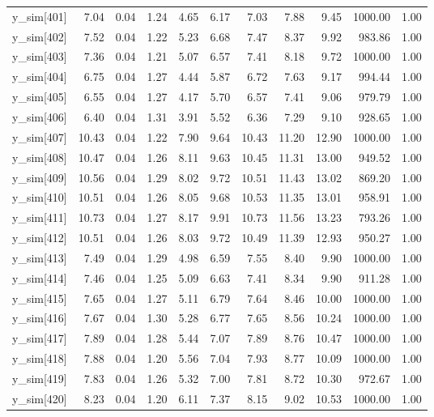 \begin{table}[ht]
\begin{tabular}{rrrrrrrrrrr}
  y\_sim[401] & 7.04 & 0.04 & 1.24 & 4.65 & 6.17 & 7.03 & 7.88 & 9.45 & 1000.00 & 1.00 \\ 
  y\_sim[402] & 7.52 & 0.04 & 1.22 & 5.23 & 6.68 & 7.47 & 8.37 & 9.92 & 983.86 & 1.00 \\ 
  y\_sim[403] & 7.36 & 0.04 & 1.21 & 5.07 & 6.57 & 7.41 & 8.18 & 9.72 & 1000.00 & 1.00 \\ 
  y\_sim[404] & 6.75 & 0.04 & 1.27 & 4.44 & 5.87 & 6.72 & 7.63 & 9.17 & 994.44 & 1.00 \\ 
  y\_sim[405] & 6.55 & 0.04 & 1.27 & 4.17 & 5.70 & 6.57 & 7.41 & 9.06 & 979.79 & 1.00 \\ 
  y\_sim[406] & 6.40 & 0.04 & 1.31 & 3.91 & 5.52 & 6.36 & 7.29 & 9.10 & 928.65 & 1.00 \\ 
  y\_sim[407] & 10.43 & 0.04 & 1.22 & 7.90 & 9.64 & 10.43 & 11.20 & 12.90 & 1000.00 & 1.00 \\ 
  y\_sim[408] & 10.47 & 0.04 & 1.26 & 8.11 & 9.63 & 10.45 & 11.31 & 13.00 & 949.52 & 1.00 \\ 
  y\_sim[409] & 10.56 & 0.04 & 1.29 & 8.02 & 9.72 & 10.51 & 11.43 & 13.02 & 869.20 & 1.00 \\ 
  y\_sim[410] & 10.51 & 0.04 & 1.26 & 8.05 & 9.68 & 10.53 & 11.35 & 13.01 & 958.91 & 1.00 \\ 
  y\_sim[411] & 10.73 & 0.04 & 1.27 & 8.17 & 9.91 & 10.73 & 11.56 & 13.23 & 793.26 & 1.00 \\ 
  y\_sim[412] & 10.51 & 0.04 & 1.26 & 8.03 & 9.72 & 10.49 & 11.39 & 12.93 & 950.27 & 1.00 \\ 
  y\_sim[413] & 7.49 & 0.04 & 1.29 & 4.98 & 6.59 & 7.55 & 8.40 & 9.90 & 1000.00 & 1.00 \\ 
  y\_sim[414] & 7.46 & 0.04 & 1.25 & 5.09 & 6.63 & 7.41 & 8.34 & 9.90 & 911.28 & 1.00 \\ 
  y\_sim[415] & 7.65 & 0.04 & 1.27 & 5.11 & 6.79 & 7.64 & 8.46 & 10.00 & 1000.00 & 1.00 \\ 
  y\_sim[416] & 7.67 & 0.04 & 1.30 & 5.28 & 6.77 & 7.65 & 8.56 & 10.24 & 1000.00 & 1.00 \\ 
  y\_sim[417] & 7.89 & 0.04 & 1.28 & 5.44 & 7.07 & 7.89 & 8.76 & 10.47 & 1000.00 & 1.00 \\ 
  y\_sim[418] & 7.88 & 0.04 & 1.20 & 5.56 & 7.04 & 7.93 & 8.77 & 10.09 & 1000.00 & 1.00 \\ 
  y\_sim[419] & 7.83 & 0.04 & 1.26 & 5.32 & 7.00 & 7.81 & 8.72 & 10.30 & 972.67 & 1.00 \\ 
  y\_sim[420] & 8.23 & 0.04 & 1.20 & 6.11 & 7.37 & 8.15 & 9.02 & 10.53 & 1000.00 & 1.00 \\ 

\end{tabular}
\end{table}
